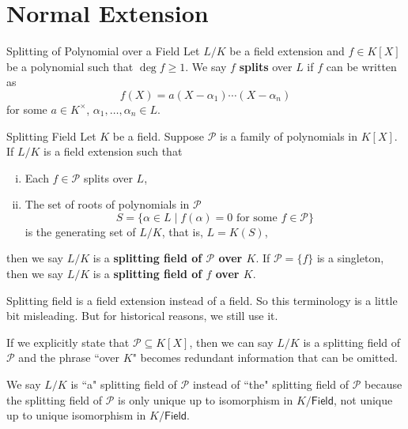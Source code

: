 \section{Normal Extension}

\begin{definition}{Splitting of Polynomial over a Field}{}
    Let $L/K$ be a field extension and $f\in K[X]$ be a polynomial such that $\deg f \ge 1$. We say $f$ \textbf{splits} over $L$ if $f$ can be written as
    \[
    f(X)=a(X-\alpha_1)\cdots(X-\alpha_n)
    \]
    for some $a\in K^\times$, $\alpha_1,\ldots,\alpha_n\in L$.
\end{definition}

\begin{definition}{Splitting Field}{}
    Let $K$ be a field. Suppose $\mathcal{P}$ is a family of polynomials in $K[X]$. If $L/K$ is a field extension such that 
    \begin{enumerate}[(i)]
        \item Each $f\in \mathcal{P}$ splits over $L$,
        \item The set of roots of polynomials in $\mathcal{P}$ 
        \[
        S=\{\alpha\in L\mid f(\alpha)=0\text{ for some }f\in \mathcal{P}\}
        \]
        is the generating set of $L/K$, that is, $L=K(S)$,
    \end{enumerate}
    then we say $L/K$ is a \textbf{splitting field of $\mathcal{P}$ over $K$}. If $\mathcal{P}=\{f\}$ is a singleton, then we say $L/K$ is a \textbf{splitting field of $f$ over $K$}.
\end{definition}
\begin{remark}
    Splitting field is a field extension instead of a field. So this terminology is a little bit misleading. But for historical reasons, we still use it.

    If we explicitly state that $\mathcal{P}\subseteq K[X]$, then we can say $L/K$ is a splitting field of $\mathcal{P}$ and the phrase ``over $K$" becomes redundant information that can be omitted.

    We say $L/K$ is ``a" splitting field of $\mathcal{P}$ instead of ``the" splitting field of $\mathcal{P}$ because the splitting field of $\mathcal{P}$ is only unique up to isomorphism in $K/\mathsf{Field}$, not unique up to unique isomorphism in $K/\mathsf{Field}$.
\end{remark}

